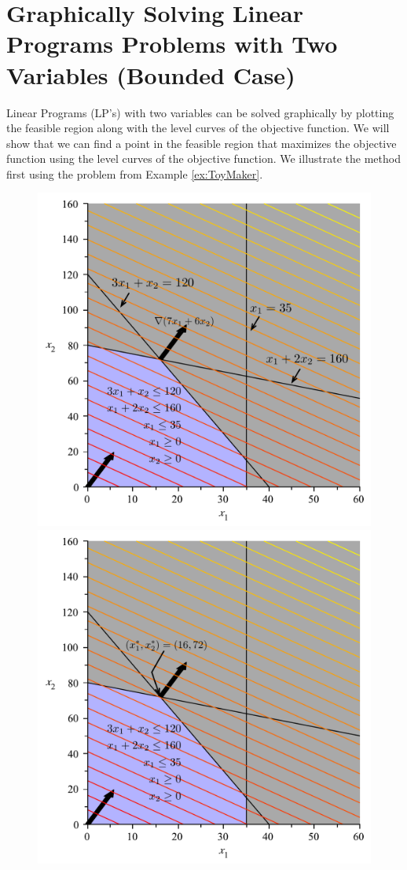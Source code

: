 


\section{Graphically Solving Linear Programs Problems with Two Variables (Bounded Case)}
Linear Programs (LP's) with two variables can be solved graphically by plotting the feasible region along with the level curves of the objective function. We will show that we can find a point in the feasible region that maximizes the objective function using the level curves of the objective function. We illustrate the method first using the problem from Example \ref{ex:ToyMaker}.

\begin{figure}[H] 
\centering
\includegraphics[scale=0.4]{FeasibleRegion.pdf}
\includegraphics[scale=0.4]{FeasibleRegionWithMax.pdf}

\end{figure}
